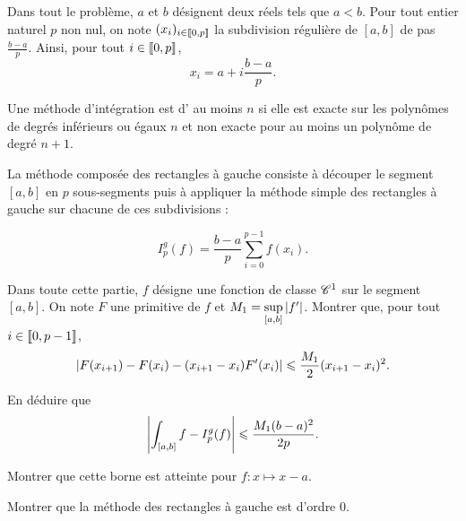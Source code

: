 \documentclass[oneside,11pt]{book}
\begin{document}
\entete
\begin{refsection}

\begin{probleme*}
Dans tout le problème, $a$ et $b$ désignent deux réels tels que $a < b$. Pour tout entier naturel $p$ non nul, on note $(x_i)_{i\in\llbracket0,p\rrbracket}$ la subdivision régulière de $[a, b]$ de pas $\frac{b-a}{p}$. Ainsi, pour tout $i \in \llbracket0,p\rrbracket$,
\[
x_i = a + i \frac{b-a}{p}.
\]

Une méthode d'intégration est d' au moins $n$ si elle est exacte sur les polynômes de degrés inférieurs ou égaux $n$ et non exacte pour au moins un polynôme de degré $n+1$.




La méthode composée des rectangles à gauche consiste à découper le segment $[a, b]$ en $p$ sous-segments puis à appliquer la méthode simple des rectangles à gauche sur chacune de ces subdivisions :
\begin{colonnes}{2}
\[
I_p^g(f) = \frac{b-a}{p} \sum_{i=0}^{p-1} f(x_i).
\]
%
\columnbreak
%
\begin{center}
  \scalebox{0.3}{}
\end{center}
\end{colonnes}

Dans toute cette partie, $f$ désigne une fonction de classe $\mathscr{C}^1$ sur le segment $[a, b]$. On note $F$ une primitive de $f$ et $M_1 = \sup\limits_{[a,b]} \left\lvert f'\right\rvert$.
\qu Montrer que, pour tout $i \in \llbracket0,p-1\rrbracket$,
\[
\left\lvert F(x_{i+1}) - F(x_i) - (x_{i+1} - x_i) F'(x_i)\right\rvert \leqslant \frac{M_1}{2} (x_{i+1}-x_i)^2.
\]


\qu En déduire que
\[
\left\lvert\int_{[a,b]} f - I_p^g(f)\right\rvert \leqslant \frac{M_1 (b-a)^2}{2 p}.
\]

\qu Montrer que cette borne est atteinte pour $f : x \mapsto x - a$.

\qu Montrer que la méthode des rectangles à gauche est d'ordre $0$.


  


\end{probleme*}
\end{refsection}
\end{document}

